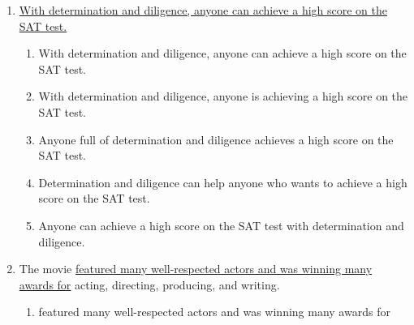 \begin{enumerate}
\begin{enumerate}
\begin{spacing}{1.5}
\begin{enumerate}[label=(\Alph*)]
\hrulefill

\item for food items, despite the increased cost, organic food sells well.

\hrulefill
 
\item for food, but organic food sells well despite the increased cost.

\hrulefill
\end{enumerate}
\end{spacing}

\bigskip
\item \ul{With determination and diligence, anyone can achieve a high score on the SAT test.}

\begin{spacing}{1.5}
\begin{enumerate}[label=(\Alph*)]

\item With determination and diligence, anyone can achieve a high score on the SAT test.

\hrulefill

\item With determination and diligence, anyone is achieving a high score on the SAT test.

\hrulefill

\item Anyone full of determination and diligence achieves a high score on the SAT test.

\hrulefill

\item Determination and diligence can help anyone who wants to achieve a high score on the SAT test.

\hrulefill

\item Anyone can achieve a high score on the SAT test with determination and diligence.

\hrulefill
\end{enumerate}
\end{spacing}

\bigskip
\item The movie \ul{featured many well-respected actors and was winning many awards for} acting, directing, producing, and writing. 

\begin{spacing}{1.5}
\begin{enumerate}[label=(\Alph*)]
\item featured many well-respected actors and was winning many awards for


\end{enumerate}
\end{spacing}
\end{enumerate}
\end{enumerate}
